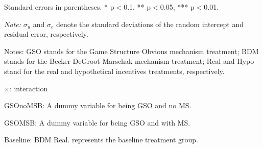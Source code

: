 \documentclass[12pt]{article}
\begin{document}
\begin{table}[H]
\begin{tablenotes}
            \footnotesize
            \item Standard errors in parentheses. * p$<$0.1, ** p$<$0.05, *** p$<$0.01.
            \item \textit{Note:} $\sigma_u$ and $\sigma_e$ denote the standard deviations of the random intercept and residual error, respectively.
            \item Notes: GSO stands for the Game Structure Obvious mechanism treatment; BDM stands for the Becker-DeGroot-Marschak mechanism treatment; Real and Hypo stand for the real and hypothetical incentives treatments, respectively.
           \item $\times$: interaction
           \item GSOnoMSB: A dummy variable for being GSO and no MS.
           \item GSOMSB: A dummy variable for being GSO and with MS.
           \item Baseline: BDM Real. represents the baseline treatment group.
        \end{tablenotes}
            \end{table}





\clearpage
\end{document}
